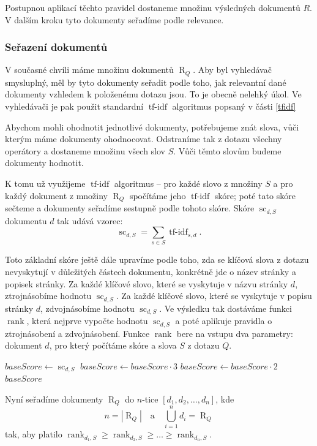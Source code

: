 \documentclass[12pt]{article}
\newcommand{\sssection}[1]{\subsubsection{#1}}
\newcommand{\addh}[1]{\left[#1\right]}
\DeclareMathOperator{\tfidf}{tf-idf}
\DeclareMathOperator{\score}{sc}
\DeclareMathOperator{\getdocs}{R}
\DeclareMathOperator{\rank}{rank}
\begin{document}
Postupnou aplikací těchto pravidel dostaneme množinu výsledných dokumentů $R$. V dalším kroku tyto dokumenty seřadíme podle relevance. 

\sssection{Seřazení dokumentů}

V současné chvíli máme množinu dokumentů $\getdocs_Q$. Aby byl vyhledávač smysluplný, měl by tyto dokumenty seřadit podle toho, jak relevantní dané dokumenty vzhledem k položenému dotazu jsou. To je obecně nelehký úkol. Ve vyhledávači je pak použit standardní $\tfidf$ algoritmus popsaný v části \ref{tfidf}

Abychom mohli ohodnotit jednotlivé dokumenty, potřebujeme znát slova, vůči kterým máme dokumenty ohodnocovat. Odstraníme tak z dotazu všechny operátory a dostaneme množinu všech slov $S$. Vůči těmto slovům budeme dokumenty hodnotit. 

K tomu už využijeme $\tfidf$ algoritmus -- pro každé slovo z množiny $S$ a pro každý dokument z množiny $\getdocs_Q$ spočítáme jeho $\tfidf$ skóre; poté tato skóre sečteme a dokumenty seřadíme sestupně podle tohoto skóre. Skóre $\score_{d,S}$ dokumentu $d$ tak udává vzorec:
$$\score_{d,S}=\sum_{s\in S} \tfidf_{s, d}.$$

Toto základní skóre ještě dále upravíme podle toho, zda se klíčová slova z dotazu nevyskytují v důležitých částech dokumentu, konkrétně jde o název stránky a popisek stránky. Za každé klíčové slovo, které se vyskytuje v názvu stránky $d$, ztrojnásobíme hodnotu $\score_{d,S}$. Za každé klíčové slovo, které se vyskytuje v popisu stránky $d$, zdvojnásobíme hodnotu $\score_{d,S}$. Ve výsledku tak dostáváme funkci $\rank$, která nejprve vypočte hodnotu $\score_{d,S}$ a poté aplikuje pravidla o ztrojnásobení a zdvojnásobení. Funkce $\rank$ bere na vstupu dva parametry: dokument $d$, pro který počítáme skóre a slova $S$ z dotazu $Q$.


\begin{algorithmic}
    \State $baseScore \gets \score_{d, S}$
    		\State $baseScore \gets baseScore \cdot 3$
    	\EndIf
    		\State $baseScore \gets baseScore \cdot 2$
    	\EndIf
    \EndFor
    \State \Return $baseScore$
\EndFunction
\end{algorithmic}



Nyní seřadíme dokumenty $\getdocs_Q$ do $n$-tice $\addh{d_1, d_2, \ldots, d_n}$, kde 
$$n=\left|\getdocs_Q\right|\quad\mbox{a}\quad \bigcup_{i=1}^n d_i=\getdocs_Q$$ 
tak, aby platilo $\rank_{d_1, S} \ge \rank_{d_2, S} \ge \ldots \ge \rank_{d_n, S}$.
\end{document}
